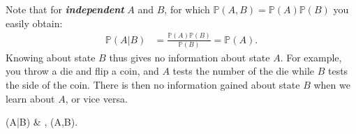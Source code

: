 \documentclass{article}
\begin{document}
Note that for \textbf{\textit{independent}} $A$ and $B$, for which $\mathbb{P}(A,B)=\mathbb{P}(A)\mathbb{P}(B)$ you easily obtain:
\begin{align}
    \mathbb{P}(A|B)&=\frac{\mathbb{P}(A)\mathbb{P}(B)}{\mathbb{P}(B)}=\mathbb{P}(A).
\end{align}
Knowing about state $B$ thus gives no information about state $A$.
For example, you throw a die and flip a coin, and $A$ tests the number of the die while $B$ tests the side of the coin. There is then no information gained about state $B$ when we learn about $A$, or vice versa.

\begin{mymathbox}[ams align, title={Conditional probability of $(A,B)\in\Omega$ (definition)}, colframe=blue!30!black, center title]
	(A|B) & \equiv {}, \quad \forall (A,B)\in\Omega.
\end{mymathbox}
\end{document}
